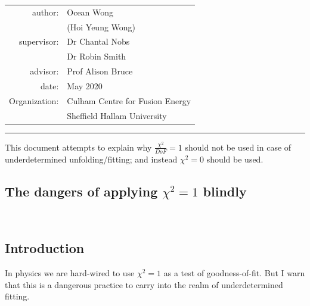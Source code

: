 \documentclass[a4paper, 12pt]{article}
\begin{document}
\centering
    
\begin{table}[!h]
\centering
\begin{tabular}{rl}
author:&Ocean Wong          \\
       &(Hoi Yeung Wong)    \\
supervisor:&Dr Chantal Nobs    \\
           &Dr Robin Smith     \\
advisor:&Prof Alison Bruce\\
date:  &May 2020       \\
Organization:&Culham Centre for Fusion Energy\\
            & Sheffield Hallam University
\end{tabular}
\end{table}
\hrule
\abstract
    This document attempts to explain why $\frac{\chi^2}{DoF} = 1$ should not be used in case of underdetermined unfolding/fitting; and instead $\chi^2=0$ should be used.
\begin{center}
\large{\chapter{The dangers of applying $\chi^2=1$ blindly}}\\
\end{center}
\section{Introduction}
In physics we are hard-wired to use $\chi^2=1$ as a test of goodness-of-fit. But I warn that this is a dangerous practice to carry into the realm of underdetermined fitting.
\end{document}
